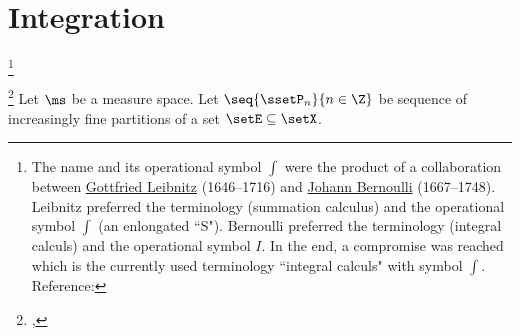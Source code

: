 ﻿%


\chapter{Integration}


\footnote{The name  and its operational symbol $\int$ were the 
  product of a collaboration between 
  \href{http://en.wikipedia.org/wiki/Gottfried_Leibniz}{Gottfried Leibnitz} (1646--1716) 
  and \href{http://en.wikipedia.org/wiki/Johann_Bernoulli}{Johann Bernoulli} (1667--1748).
  Leibnitz preferred the terminology  (summation calculus)
  and the operational symbol $\int$ (an enlongated ``S").
  Bernoulli preferred the terminology  (integral calculs)
  and the operational symbol $I$.
  In the end, a compromise was reached which is the currently used terminology 
  ``integral calculs" with symbol $\int$.
  Reference: 
  }
\begin{definition}
\footnote{
  ,
  }
\label{def:cintop}
Let $\ms$ be a measure space.
Let $\seq{\ssetP_n}{n\in\Z}$ be sequence of increasingly fine partitions 
of a set $\setE\subseteq\setX$.
\end{definition}

